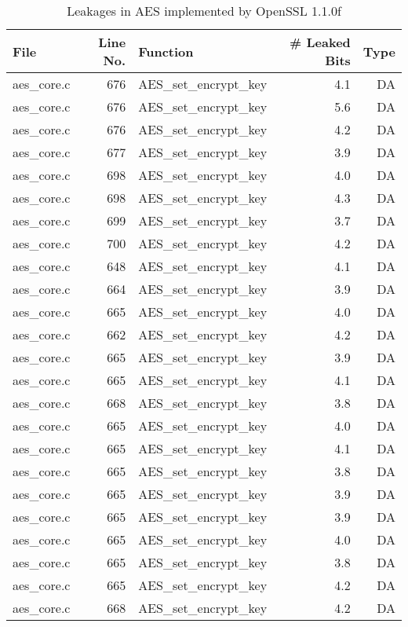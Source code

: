 \begin{table}[h!]
\centering\tiny\scriptsize
\renewcommand{\baselinestretch}{0.96}\selectfont
\caption{Leakages in AES implemented by OpenSSL 1.1.0f}\label{tab:AESOpenSSL1.1.0f}
\begin{tabular}{lrlrr}
\hline
\textbf{File} & \textbf{Line No.} & \textbf{Function} & \textbf{\# Leaked Bits} & \textbf{Type} \\\hline
aes\_core.c& 676&AES\_set\_encrypt\_key&4.1 &DA\\
aes\_core.c& 676&AES\_set\_encrypt\_key&5.6 &DA\\
aes\_core.c& 676&AES\_set\_encrypt\_key&4.2 &DA\\
aes\_core.c& 677&AES\_set\_encrypt\_key&3.9 &DA\\
aes\_core.c& 698&AES\_set\_encrypt\_key&4.0 &DA\\
aes\_core.c& 698&AES\_set\_encrypt\_key&4.3 &DA\\
aes\_core.c& 699&AES\_set\_encrypt\_key&3.7 &DA\\
aes\_core.c& 700&AES\_set\_encrypt\_key&4.2 &DA\\
aes\_core.c& 648&AES\_set\_encrypt\_key&4.1 &DA\\
aes\_core.c& 664&AES\_set\_encrypt\_key&3.9 &DA\\
aes\_core.c& 665&AES\_set\_encrypt\_key&4.0 &DA\\
aes\_core.c& 662&AES\_set\_encrypt\_key&4.2 &DA\\
aes\_core.c& 665&AES\_set\_encrypt\_key&3.9 &DA\\
aes\_core.c& 665&AES\_set\_encrypt\_key&4.1 &DA\\
aes\_core.c& 668&AES\_set\_encrypt\_key&3.8 &DA\\
aes\_core.c& 665&AES\_set\_encrypt\_key&4.0 &DA\\
aes\_core.c& 665&AES\_set\_encrypt\_key&4.1 &DA\\
aes\_core.c& 665&AES\_set\_encrypt\_key&3.8 &DA\\
aes\_core.c& 665&AES\_set\_encrypt\_key&3.9 &DA\\
aes\_core.c& 665&AES\_set\_encrypt\_key&3.9 &DA\\
aes\_core.c& 665&AES\_set\_encrypt\_key&4.0 &DA\\
aes\_core.c& 665&AES\_set\_encrypt\_key&3.8 &DA\\
aes\_core.c& 665&AES\_set\_encrypt\_key&4.2 &DA\\
aes\_core.c& 668&AES\_set\_encrypt\_key&4.2 &DA\\

\end{tabular}
\end{table}
